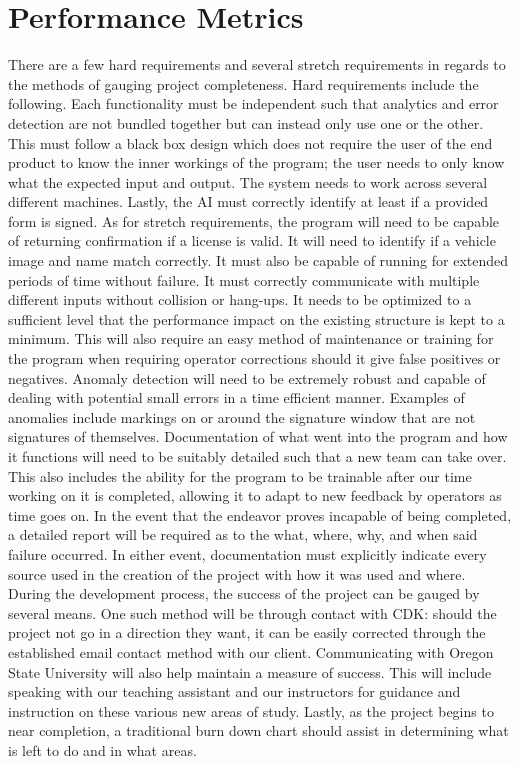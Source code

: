 \documentclass[onecolumn, draftclsnofoot,10pt, compsoc]{IEEEtran}
\begin{document}
\section{Performance Metrics}
	
	There are a few hard requirements and several stretch requirements in regards to the methods of gauging project completeness. Hard requirements include the following. Each functionality must be independent such that analytics and error detection are not bundled together but can instead only use one or the other. This must follow a black box design which does not require the user of the end product to know the inner workings of the program; the user needs to only know what the expected input and output. The system needs to work across several different machines. Lastly, the AI must correctly identify at least if a provided form is signed. As for stretch requirements, the program will need to be capable of returning confirmation if a license is valid. It will need to identify if a vehicle image and name match correctly. It must also be capable of running for extended periods of time without failure. It must correctly communicate with multiple different inputs without collision or hang-ups. It needs to be optimized to a sufficient level that the performance impact on the existing structure is kept to a minimum. This will also require an easy method of maintenance or training for the program when requiring operator corrections should it give false positives or negatives. Anomaly detection will need to be extremely robust and capable of dealing with potential small errors in a time efficient manner. Examples of anomalies include markings on or around the signature window that are not signatures of themselves. Documentation of what went into the program and how it functions will need to be suitably detailed such that a new team can take over. This also includes the ability for the program to be trainable after our time working on it is completed, allowing it to adapt to new feedback by operators as time goes on. In the event that the endeavor proves incapable of being completed, a detailed report will be required as to the what, where, why, and when said failure occurred. In either event, documentation must explicitly indicate every source used in the creation of the project with how it was used and where. During the development process, the success of the project can be gauged by several means. One such method will be through contact with CDK: should the project not go in a direction they want, it can be easily corrected through the established email contact method with our client. Communicating with Oregon State University will also help maintain a measure of success. This will include speaking with our teaching assistant and our instructors for guidance and instruction on these various new areas of study. Lastly, as the project begins to near completion, a traditional burn down chart should assist in determining what is left to do and in what areas.
	
\end{document}
